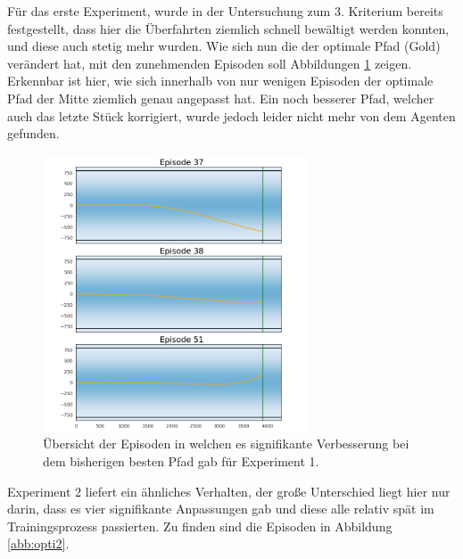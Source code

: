 \documentclass[]{iat}
\begin{document}
Für das erste Experiment, wurde in der Untersuchung zum 3. Kriterium bereits festgestellt, dass hier die Überfahrten ziemlich schnell bewältigt werden konnten, und diese auch stetig mehr wurden. Wie sich nun die der optimale Pfad (Gold) verändert hat, mit den zunehmenden Episoden soll Abbildungen \ref{abb:opti1} zeigen. Erkennbar ist hier, wie sich innerhalb von nur wenigen Episoden der optimale Pfad der Mitte ziemlich genau angepasst hat. Ein noch besserer Pfad, welcher auch das letzte Stück korrigiert, wurde jedoch leider nicht mehr von dem Agenten gefunden.
\begin{figure}[H]
    \includegraphics[width=0.7\textwidth]{graphics/optimum_s1/optimum_s1.png}
    \centering
    \caption{Übersicht der Episoden in welchen es signifikante Verbesserung bei dem bisherigen besten Pfad gab für Experiment 1.}
    \label{abb:opti1}
\end{figure}
Experiment 2 liefert ein ähnliches Verhalten, der große Unterschied liegt hier nur darin, dass es vier signifikante Anpassungen gab und diese alle relativ spät im Trainingsprozess passierten. Zu finden sind die Episoden in Abbildung \ref{abb:opti2}.
\end{document}

